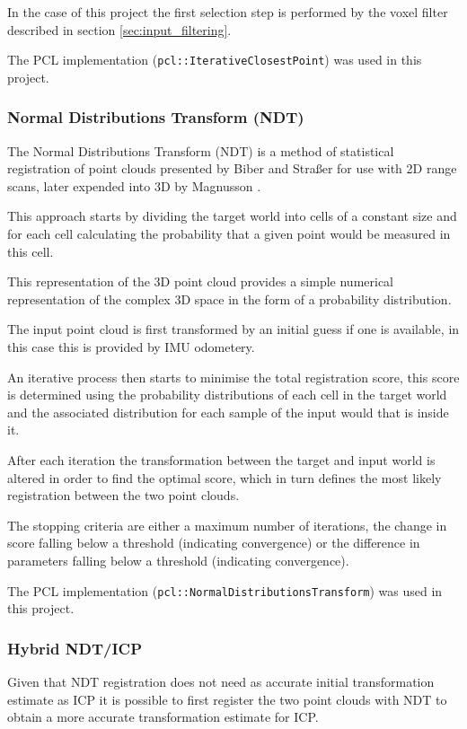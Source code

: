 \documentclass{entcs}
\begin{document}
In the case of this project the first selection step is performed by the voxel
filter described in section \ref{sec:input_filtering}.

The PCL implementation (\texttt{pcl::IterativeClosestPoint}) was used in this
project.

\subsubsection{Normal Distributions Transform (NDT)}

The Normal Distributions Transform (NDT) is a method of statistical registration
of point clouds presented by Biber and Stra{\ss}er \cite{Biber2003} for use with
2D range scans, later expended into 3D by Magnusson \cite{Magnusson2008}.

This approach starts by dividing the target world into cells of a constant size
and for each cell calculating the probability that a given point would be
measured in this cell.

This representation of the 3D point cloud provides a simple numerical
representation of the complex 3D space in the form of a probability
distribution.

The input point cloud is first transformed by an initial guess if one is
available, in this case this is provided by IMU odometery.

An iterative process then starts to minimise the total registration score, this
score is determined using the probability distributions of each cell in the
target world and the associated distribution for each sample of the input would
that is inside it.

After each iteration the transformation between the target and input world is
altered in order to find the optimal score, which in turn defines the most
likely registration between the two point clouds.

The stopping criteria are either a maximum number of iterations, the change in
score falling below a threshold (indicating convergence) or the difference in
parameters falling below a threshold (indicating convergence).

The PCL implementation (\texttt{pcl::NormalDistributionsTransform}) was used in
this project.

\subsubsection{Hybrid NDT/ICP}

Given that NDT registration does not need as accurate initial transformation
estimate as ICP it is possible to first register the two point clouds with NDT
to obtain a more accurate transformation estimate for ICP.
\end{document}
